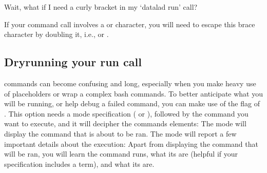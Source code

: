 \ignorespaces \begin{findoutmore}[label={fom-run-curly}, before title={\thetcbcounter\ }, float, floatplacement=tb, check odd page=true]{Wait, what if I need a curly bracket in my ‘datalad run’ call?}
\label{\detokenize{basics/101-110-run2:fom-run-curly}}

\sphinxAtStartPar
If your command call involves a \sphinxcode{\sphinxupquote{\{}} or \sphinxcode{\sphinxupquote{\}}} character, you will need to escape
this brace character by doubling it, i.e., \sphinxcode{\sphinxupquote{\{\{}} or \sphinxcode{\sphinxupquote{\}\}}}.


\end{findoutmore}

\ignorespaces 

\subsection{Dry\sphinxhyphen{}running your run call}
\label{\detokenize{basics/101-110-run2:dry-running-your-run-call}}\label{\detokenize{basics/101-110-run2:dryrun}}\label{\detokenize{basics/101-110-run2:index-13}}
\sphinxAtStartPar
{} commands can become confusing and long, especially when you make heavy use of placeholders or wrap a complex bash commands.
To better anticipate what you will be running, or help debug a failed command, you can make use of the   flag of .
This option needs a mode specification ( or ), followed by the  command you want to execute, and it will decipher the commands elements:
The mode  will display the command that is about to be ran.
The mode  will report a few important details about the execution:
Apart from displaying the command that will be ran, you will learn  the command runs, what its  are (helpful if your  specification includes a {\hyperref[\detokenize{glossary:term-globbing}]{}} term), and what its  are.

